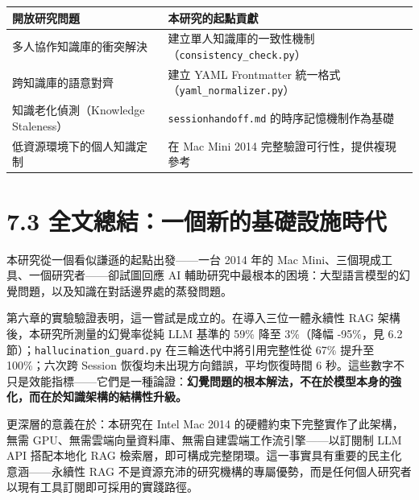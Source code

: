 {\def\LTcaptype{none} %
\begin{longtable}[]{@{}
  >{\raggedright\arraybackslash}p{}
  >{\raggedright\arraybackslash}p{}@{}}
\toprule\noalign{}
\begin{minipage}[b]{\linewidth}\raggedright
開放研究問題
\end{minipage} & \begin{minipage}[b]{\linewidth}\raggedright
本研究的起點貢獻
\end{minipage} \\
\midrule\noalign{}
\endhead
\bottomrule\noalign{}
\endlastfoot
多人協作知識庫的衝突解決 &
建立單人知識庫的一致性機制（\texttt{consistency\_check.py}） \\
跨知識庫的語意對齊 & 建立 YAML Frontmatter
統一格式（\texttt{yaml\_normalizer.py}） \\
知識老化偵測（Knowledge Staleness） & \texttt{sessionhandoff.md}
的時序記憶機制作為基礎 \\
低資源環境下的個人知識定制 & 在 Mac Mini 2014
完整驗證可行性，提供複現參考 \\
\end{longtable}
}

\section{7.3
全文總結：一個新的基礎設施時代}\label{ux5168ux6587ux7e3dux7d50ux4e00ux500bux65b0ux7684ux57faux790eux8a2dux65bdux6642ux4ee3}

本研究從一個看似謙遜的起點出發------一台 2014 年的 Mac
Mini、三個現成工具、一個研究者------卻試圖回應 AI
輔助研究中最根本的困境：大型語言模型的幻覺問題，以及知識在對話邊界處的蒸發問題。

第六章的實驗驗證表明，這一嘗試是成立的。在導入三位一體永續性 RAG
架構後，本研究所測量的幻覺率從純 LLM 基準的 59\% 降至 3\%（降幅
-95\%，見 6.2 節）；\texttt{hallucination\_guard.py}
在三輪迭代中將引用完整性從 67\% 提升至 100\%；六次跨 Session
恢復均未出現方向錯誤，平均恢復時間 6
秒。這些數字不只是效能指標------它們是一種論證：\textbf{幻覺問題的根本解法，不在於模型本身的強化，而在於知識架構的結構性升級。}

更深層的意義在於：本研究在 Intel Mac 2014
的硬體約束下完整實作了此架構，無需
GPU、無需雲端向量資料庫、無需自建雲端工作流引擎------以訂閱制 LLM API
搭配本地化 RAG
檢索層，即可構成完整閉環。這一事實具有重要的民主化意涵------永續性 RAG
不是資源充沛的研究機構的專屬優勢，而是任何個人研究者以現有工具訂閱即可採用的實踐路徑。

